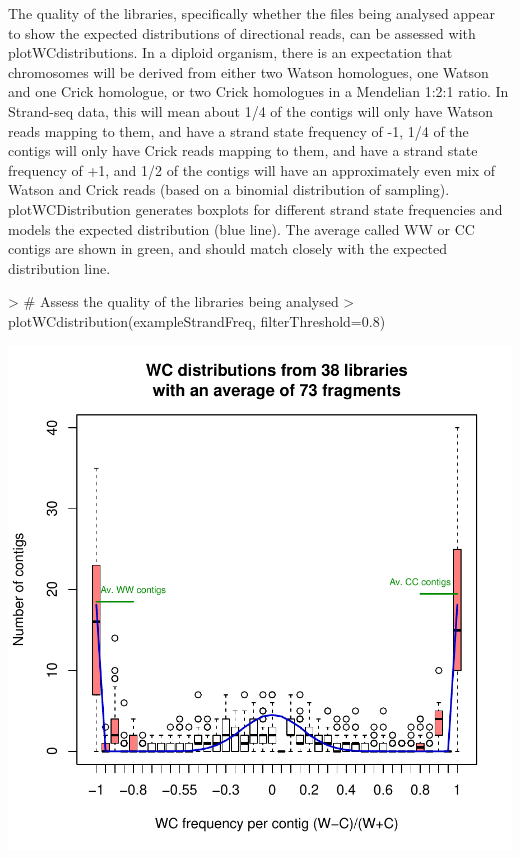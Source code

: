\documentclass{article}
\begin{document}
The quality of the libraries, specifically whether the files being analysed appear to show the expected distributions of directional reads, can be assessed with plotWCdistributions.  In a diploid organism, there is an expectation that chromosomes will be derived from either two Watson homologues, one Watson and one Crick homologue, or two Crick homologues in a Mendelian 1:2:1 ratio.  In Strand-seq data, this will mean about 1/4 of the contigs will only have Watson reads mapping to them, and have a strand state frequency of -1, 1/4 of the contigs will only have Crick reads mapping to them, and have a strand state frequency of +1, and 1/2 of the contigs will have an approximately even mix of Watson and Crick reads (based on a binomial distribution of sampling).  plotWCDistribution generates boxplots for different strand state frequencies and models the expected distribution (blue line). The average called WW or CC contigs are shown in green, and should match closely with the expected distribution line.

\begin{Schunk}
\begin{Sinput}
> # Assess the quality of the libraries being analysed
> plotWCdistribution(exampleStrandFreq, filterThreshold=0.8)
\end{Sinput}
\end{Schunk}
\includegraphics{contiBAIT-strandSeqFreqTableExamplec}
\end{document}

